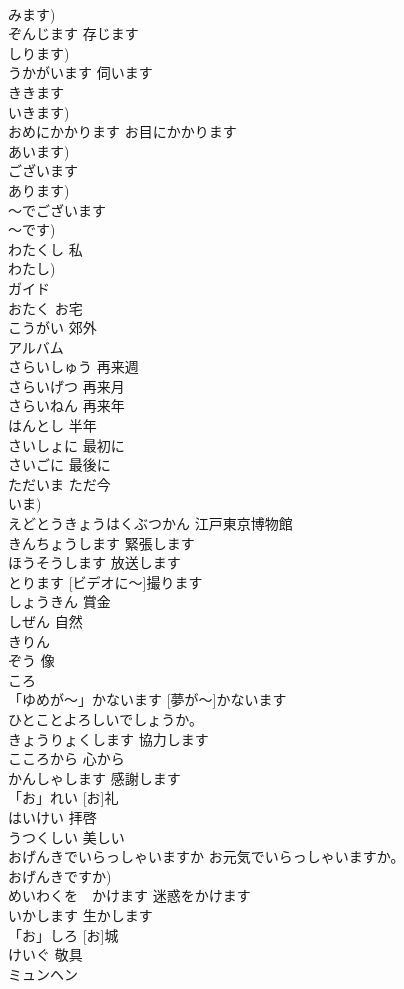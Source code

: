 \documentclass[8pt]{extreport}
\begin{document}
\begin{CJK}{UTF8}{min}
\\	みます)		
\\	ぞんじます	存じます	
\\	しります)		
\\	うかがいます	伺います	
\\	ききます 
\\	いきます)		
\\	おめにかかります	お目にかかります	
\\	あいます)		
\\	ございます			
\\	あります)		
\\	～でございます			
\\	～です)		
\\	わたくし	私	
\\	わたし)		
\\	ガイド			
\\	おたく	お宅	
\\	こうがい	郊外	
\\	アルバム			
\\	さらいしゅう	再来週	
\\	さらいげつ	再来月	
\\	さらいねん	再来年	
\\	はんとし	半年	
\\	さいしょに	最初に	
\\	さいごに	最後に	
\\	ただいま	ただ今	
\\	いま)		
\\	えどとうきょうはくぶつかん	江戸東京博物館	
\\	きんちょうします	緊張します	
\\	ほうそうします	放送します	
\\	[ビデオに～]とります	[ビデオに～]撮ります	
\\	しょうきん	賞金	
\\	しぜん	自然	
\\	きりん			
\\	ぞう	像	
\\	ころ			
\\	「ゆめが～」かないます	[夢が～]かないます	
\\	ひとことよろしいでしょうか。			
\\	きょうりょくします	協力します	
\\	こころから	心から	
\\	かんしゃします	感謝します	
\\	「お」れい	[お]礼	
\\	はいけい	拝啓	
\\	うつくしい	美しい	
\\	おげんきでいらっしゃいますか	お元気でいらっしゃいますか。	
\\	おげんきですか)		
\\	めいわくを　かけます	迷惑をかけます		
\\	いかします	生かします		
\\	「お」しろ	[お]城		
\\	けいぐ	敬具		
\\	ミュンヘン			
\end{CJK}
\end{document}
